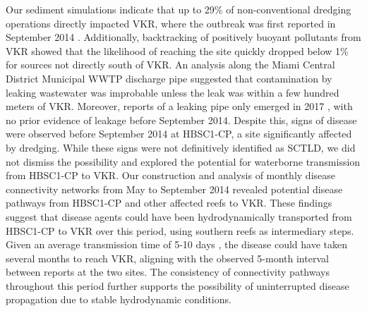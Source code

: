 \documentclass[preprint,12pt,authoryear]{elsarticle}
\begin{document}
Our sediment simulations indicate that up to 29\% of non-conventional dredging operations directly impacted VKR, where the outbreak was first reported in September 2014 \citep{precht2016unprecedented}. Additionally, backtracking of positively buoyant pollutants from VKR showed that the likelihood of reaching the site quickly dropped below 1\% for sources not directly south of VKR. An analysis along the Miami Central District Municipal WWTP discharge pipe suggested that contamination by leaking wastewater was improbable unless the leak was within a few hundred meters of VKR. Moreover, reports of a leaking pipe only emerged in 2017 \citep{staletovich2017}, with no prior evidence of leakage before September 2014. Despite this, signs of disease were observed before September 2014 at HBSC1-CP, a site significantly affected by dredging. While these signs were not definitively identified as SCTLD, we did not dismiss the possibility and explored the potential for waterborne transmission from HBSC1-CP to VKR. Our construction and analysis of monthly disease connectivity networks from May to September 2014 revealed potential disease pathways from HBSC1-CP and other affected reefs to VKR. These findings suggest that disease agents could have been hydrodynamically transported from HBSC1-CP to VKR over this period, using southern reefs as intermediary steps. Given an average transmission time of 5-10 days \citep{dobbelaere2020coupled}, the disease could have taken several months to reach VKR, aligning with the observed 5-month interval between reports at the two sites. The consistency of connectivity pathways throughout this period further supports the possibility of uninterrupted disease propagation due to stable hydrodynamic conditions.
\end{document}
